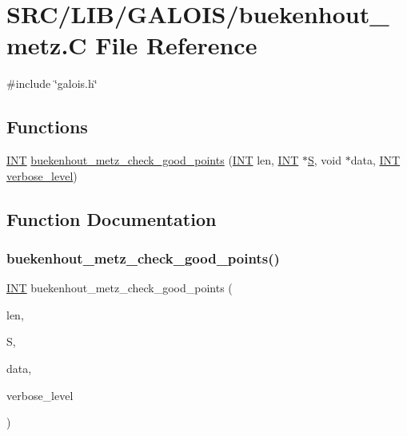 \hypertarget{buekenhout__metz_8_c}{}\section{S\+R\+C/\+L\+I\+B/\+G\+A\+L\+O\+I\+S/buekenhout\+\_\+metz.C File Reference}
\label{buekenhout__metz_8_c}
{\ttfamily \#include \char`\"{}galois.\+h\char`\"{}}\newline
\subsection*{Functions}
\begin{DoxyCompactItemize}
\item 
\mbox{\hyperlink{galois_8h_a09fddde158a3a20bd2dcadb609de11dc}{I\+NT}} \mbox{\hyperlink{buekenhout__metz_8_c_afde86c67df8cbf536861e9bd726b840c}{buekenhout\+\_\+metz\+\_\+check\+\_\+good\+\_\+points}} (\mbox{\hyperlink{galois_8h_a09fddde158a3a20bd2dcadb609de11dc}{I\+NT}} len, \mbox{\hyperlink{galois_8h_a09fddde158a3a20bd2dcadb609de11dc}{I\+NT}} $\ast$\mbox{\hyperlink{simeon_8_c_adab47f8243f1b5a2c31df2535d6b37d0}{S}}, void $\ast$data, \mbox{\hyperlink{galois_8h_a09fddde158a3a20bd2dcadb609de11dc}{I\+NT}} \mbox{\hyperlink{simeon_8_c_a818073fbcc2f439e7c56952f67386122}{verbose\+\_\+level}})
\end{DoxyCompactItemize}


\subsection{Function Documentation}
\mbox{\label{buekenhout__metz_8_c_afde86c67df8cbf536861e9bd726b840c}} 
\subsubsection{\texorpdfstring{buekenhout\+\_\+metz\+\_\+check\+\_\+good\+\_\+points()}{buekenhout\_metz\_check\_good\_points()}}
{\footnotesize\ttfamily \mbox{\hyperlink{galois_8h_a09fddde158a3a20bd2dcadb609de11dc}{I\+NT}} buekenhout\+\_\+metz\+\_\+check\+\_\+good\+\_\+points (\begin{DoxyParamCaption}\item[{\mbox{\hyperlink{galois_8h_a09fddde158a3a20bd2dcadb609de11dc}{I\+NT}}}]{len,  }\item[{\mbox{\hyperlink{galois_8h_a09fddde158a3a20bd2dcadb609de11dc}{I\+NT}} $\ast$}]{S,  }\item[{void $\ast$}]{data,  }\item[{\mbox{\hyperlink{galois_8h_a09fddde158a3a20bd2dcadb609de11dc}{I\+NT}}}]{verbose\+\_\+level }\end{DoxyParamCaption})}

